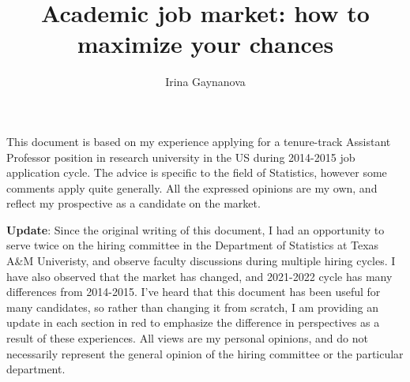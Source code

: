 \documentclass{article}
\title{Academic job market: how to maximize your chances}
\author{Irina Gaynanova}
\begin{document}
\maketitle

This document is based on my experience applying for a tenure-track Assistant Professor position in research university in the US during 2014-2015 job application cycle. The advice is specific to the field of Statistics, however some comments apply quite generally. All the expressed opinions are my own, and reflect my prospective as a candidate on the market.

{\color{red} \textbf{Update}: Since the original writing of this document, I had an opportunity to serve twice on the hiring committee in the Department of Statistics at Texas A\&M Univeristy, and observe faculty discussions during multiple hiring cycles. I have also observed that the market has changed, and 2021-2022 cycle has many differences from 2014-2015. I've heard that this document has been useful for many candidates, so rather than changing it from scratch, I am providing an update in each section in red to emphasize the difference in perspectives as a result of these experiences. All views are my personal opinions, and do not necessarily represent the general opinion of the hiring committee or the particular department.}
\end{document}
